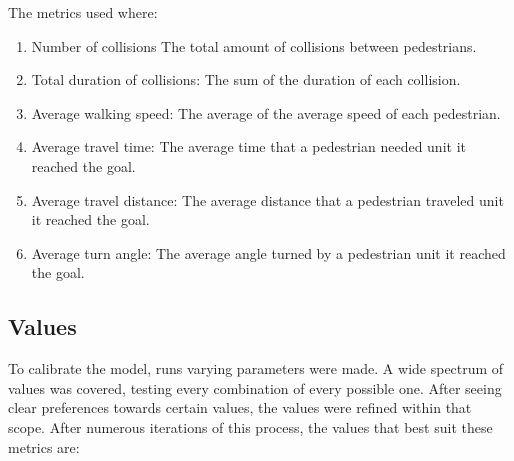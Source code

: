 \documentclass[draftclsnofoot]{IEEEtran}
\begin{document}
The metrics used where: 
\begin{enumerate}

    \item Number of collisions
    The total amount of collisions between pedestrians.
    
    \item Total duration of collisions:
    The sum of the duration of each collision.
    
    \item Average walking speed:
    The average of the average speed of each pedestrian.
    
    \item Average travel time:
    The average time that a pedestrian needed unit it reached the goal.
    
    \item Average travel distance:
    The average distance that a pedestrian traveled unit it reached the
    goal.
    
    \item Average turn angle:
    The average angle turned by a pedestrian unit it reached the goal.

\end{enumerate}

\subsection{Values}

To calibrate the model, runs varying parameters were made. A wide
spectrum of values was covered, testing every combination of every
possible one. After seeing clear preferences towards certain values,
the values were refined within that scope. After numerous iterations
of this process, the values that best suit these metrics are:
\end{document}
